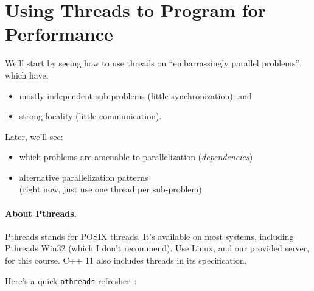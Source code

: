 




\section*{Using Threads to Program for Performance}
We'll start by seeing how to use threads on ``embarrassingly parallel problems'', which have:
  \begin{itemize}
    \item mostly-independent sub-problems (little synchronization); and
    \item strong locality (little communication).
  \end{itemize}

Later, we'll see:
  \begin{itemize}
    \item which problems are amenable to parallelization (\emph{dependencies})
    \item alternative parallelization patterns\\(right now, just use one thread
          per sub-problem)
  \end{itemize}

\paragraph{About Pthreads.} Pthreads stands for POSIX threads. It's available
on most systems, including Pthreads Win32 (which I don't recommend).
Use Linux, and our provided server, for this course. C++ 11 also includes threads
in its specification.


Here's a quick {\tt pthreads} refresher~\cite{mos}:

